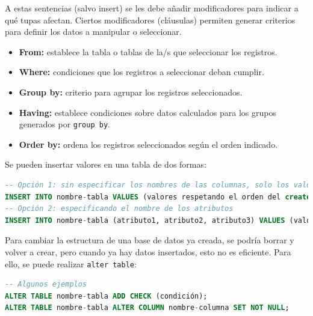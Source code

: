 A estas sentencias (salvo insert) se les debe añadir modificadores para indicar a qué tupas afectan. Ciertos modificadores (cláusulas) permiten generar criterios para definir los datos a manipular o seleccionar.
\begin{itemize}
\item \textbf{From:} establece la tabla o tablas de la/s que seleccionar los registros.
\item \textbf{Where:} condiciones que los registros a seleccionar deban cumplir.
\item \textbf{Group by:} criterio para agrupar los registros seleccionados.
\item \textbf{Having:} establece condiciones sobre datos calculados para los grupos generados por \texttt{group by}.
\item \textbf{Order by:} ordena los registros seleccionados según el orden indicado.
\end{itemize}

Se pueden insertar valores en una tabla de dos formas:
\begin{lstlisting}[language=SQL]
-- Opción 1: sin especificar los nombres de las columnas, solo los valores
INSERT INTO nombre-tabla VALUES (valores respetando el orden del create table);
-- Opción 2: especificando el nombre de los atributos
INSERT INTO nombre-tabla (atributo1, atributo2, atributo3) VALUES (valor1, valor2, null)
\end{lstlisting}

Para cambiar la estructura de una base de datos ya creada, se podría borrar y volver a crear, pero cuando ya hay datos insertados, esto no es eficiente. Para ello, se puede realizar \texttt{alter table}:
\begin{lstlisting}[language=SQL]
-- Algunos ejemplos
ALTER TABLE nombre-tabla ADD CHECK (condición);
ALTER TABLE nombre-tabla ALTER COLUMN nombre-columna SET NOT NULL;
\end{lstlisting}

